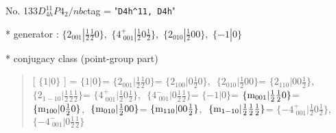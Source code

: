 \documentclass[fleqn,10pt,landscape]{jsarticle}
\begin{document}
\newpage

No. 133\quad$D_{4h}^{11}$\quad$P4_2/nbc$\quad[ tetragonal ]
tag = "{\tt D4h^11, D4h}"

* generator : $\{2{}_{001}|\frac{1}{2} \frac{1}{2} 0\},\,\,\{4^{+}_{\,\,001}|\frac{1}{2} 0 \frac{1}{2}\},\,\,\{2{}_{010}|\frac{1}{2} 0 0\},\,\,\{-1|0\}$

* conjugacy class (point-group part)
\begin{quote}
[ $\{1|0\}$ ] = \quad $\{1|0\}$ = \quad $\{2{}_{001}|\frac{1}{2} \frac{1}{2} 0\}$\newline[ $\{2{}_{100}|0 \frac{1}{2} 0\}$ ] = \quad $\{2{}_{100}|0 \frac{1}{2} 0\}$,\,\, $\{2{}_{010}|\frac{1}{2} 0 0\}$\newline[ $\{2{}_{110}|0 0 \frac{1}{2}\}$ ] = \quad $\{2{}_{110}|0 0 \frac{1}{2}\}$,\,\, $\{2{}_{1-10}|\frac{1}{2} \frac{1}{2} \frac{1}{2}\}$ = \quad $\{4^{+}_{\,\,001}|\frac{1}{2} 0 \frac{1}{2}\}$,\,\, $\{4^{-}_{\,\,001}|0 \frac{1}{2} \frac{1}{2}\}$\newline[ $\{-1|0\}$ ] = \quad $\{-1|0\}$ = \quad $\{{\rm m}_{001}|\frac{1}{2} \frac{1}{2} 0\}$\newline[ $\{{\rm m}_{100}|0 \frac{1}{2} 0\}$ ] = \quad $\{{\rm m}_{100}|0 \frac{1}{2} 0\}$,\,\, $\{{\rm m}_{010}|\frac{1}{2} 0 0\}$\newline[ $\{{\rm m}_{110}|0 0 \frac{1}{2}\}$ ] = \quad $\{{\rm m}_{110}|0 0 \frac{1}{2}\}$,\,\, $\{{\rm m}_{1-10}|\frac{1}{2} \frac{1}{2} \frac{1}{2}\}$ = \quad $\{-4^{+}_{\,\,001}|\frac{1}{2} 0 \frac{1}{2}\}$,\,\, $\{-4^{-}_{\,\,001}|0 \frac{1}{2} \frac{1}{2}\}$\newline
\end{quote}
\end{document}
